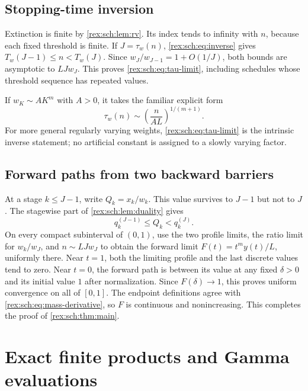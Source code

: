 \subsection{Stopping-time inversion}

Extinction is finite by \cref{rex:sch:lem:rv}. Its index tends to infinity
with $n$, because each fixed threshold is finite. If $J=\tau_w(n)$,
\eqref{rex:sch:eq:inverse} gives $T_w(J-1)\leq n<T_w(J)$.
Since $w_J/w_{J-1}=1+O(1/J)$, both bounds are asymptotic to
$LJw_J$. This proves \eqref{rex:sch:eq:tau-limit}, including schedules whose
threshold sequence has repeated values.

If $w_K\sim A K^m$ with $A>0$, it takes the familiar explicit form
\begin{equation}\label{rex:sch:eq:explicit-stopping}
 \tau_w(n)\sim\left(\frac{n}{A L}\right)^{1/(m+1)}.
\end{equation}
For more general regularly varying weights,
\eqref{rex:sch:eq:tau-limit} is the intrinsic inverse statement; no artificial
constant is assigned to a slowly varying factor.

\subsection{Forward paths from two backward barriers}

At a stage $k\leq J-1$, write $Q_k=x_k/w_k$. This value survives to
$J-1$ but not to $J$. The stagewise part of \cref{rex:sch:lem:duality} gives
\begin{equation}\label{rex:sch:eq:forward-barriers}
 q_k^{(J-1)}\leq Q_k<q_k^{(J)}.
\end{equation}
On every compact subinterval of $(0,1)$, use the two profile limits,
the ratio limit for $w_k/w_J$, and $n\sim LJw_J$ to obtain the
forward limit $F(t)=t^my(t)/L$, uniformly there. Near $t=1$, both
the limiting profile and the last discrete values tend to zero.
Near $t=0$, the forward path is between its value at any fixed
$\delta>0$ and its initial value $1$ after normalization.
Since $F(\delta)\to1$, this proves uniform convergence on all of
$[0,1]$. The endpoint definitions agree with
\eqref{rex:sch:eq:mass-derivative}, so $F$ is continuous and nonincreasing.
This completes the proof of \cref{rex:sch:thm:main}.

\section{Exact finite products and Gamma evaluations}
\label{rex:sch:sec:gamma}

